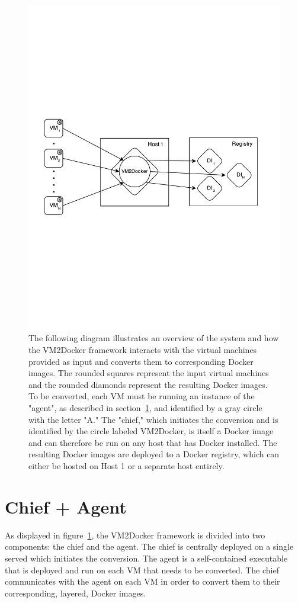 \begin{figure}[h]
\centering
   \label{fig:sys}
    \includegraphics[width=1.0\textwidth]{system2.pdf}
    \caption{The following diagram illustrates an overview of the system and how the VM2Docker framework interacts with the virtual machines provided as input and converts them to corresponding Docker images. The rounded squares represent the input virtual machines and the rounded diamonds represent the resulting Docker images. To be converted, each VM must be running an instance of the "agent", as described in section~\ref{sec:agent}, and identified by a gray circle with the letter "A." The "chief," which initiates the conversion and is identified by the circle labeled VM2Docker, is itself a Docker image and can therefore be run on any host that has Docker installed. The resulting Docker images are deployed to a Docker registry, which can either be hosted on Host 1 or a separate host entirely. }
\end{figure}
\section{Chief + Agent}
\label{sec:agent}
As displayed in figure~\ref{fig:sys}, the VM2Docker framework is divided into two components: the chief and the agent. The chief is centrally deployed on a single served which initiates the conversion. The agent is a self-contained executable that is deployed and run on each VM that needs to be converted. The chief communicates with the agent on each VM in order to convert them to their corresponding, layered, Docker images.  

